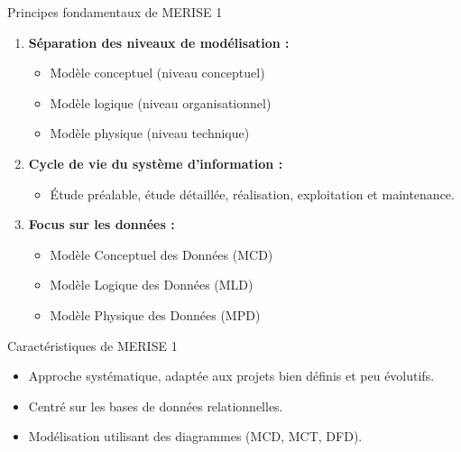 \documentclass{beamer}
\begin{document}
\begin{frame}{Principes fondamentaux de MERISE 1}
\begin{enumerate}
    \item \textbf{Séparation des niveaux de modélisation :}
    \begin{itemize}
        \item Modèle conceptuel (niveau conceptuel)
        \item Modèle logique (niveau organisationnel)
        \item Modèle physique (niveau technique)
    \end{itemize}
    \item \textbf{Cycle de vie du système d’information :}
    \begin{itemize}
        \item Étude préalable, étude détaillée, réalisation, exploitation et maintenance.
    \end{itemize}
    \item \textbf{Focus sur les données :}
    \begin{itemize}
        \item Modèle Conceptuel des Données (MCD)
        \item Modèle Logique des Données (MLD)
        \item Modèle Physique des Données (MPD)
    \end{itemize}
\end{enumerate}
\end{frame}

\begin{frame}{Caractéristiques de MERISE 1}
\begin{itemize}
    \item Approche systématique, adaptée aux projets bien définis et peu évolutifs.
    \item Centré sur les bases de données relationnelles.
    \item Modélisation utilisant des diagrammes (MCD, MCT, DFD).
\end{itemize}
\end{frame}
\end{document}
